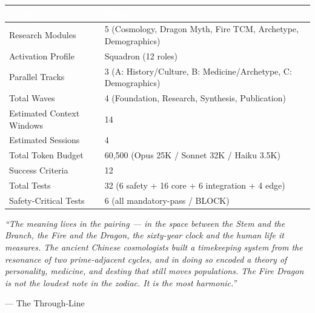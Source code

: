 \documentclass[11pt,letterpaper]{article}
\newcommand{\tableheader}[1]{\textbf{\sffamily\textcolor{white}{#1}}}
\begin{document}
\begin{center}
\begin{tabularx}{\textwidth}{L{4cm}X}
\toprule
{}
\tableheader{Metric} & \tableheader{Value} \\
\midrule
Research Modules & 5 (Cosmology, Dragon Myth, Fire TCM, Archetype, Demographics) \\
Activation Profile & Squadron (12 roles) \\
Parallel Tracks & 3 (A: History/Culture, B: Medicine/Archetype, C: Demographics) \\
Total Waves & 4 (Foundation, Research, Synthesis, Publication) \\
Estimated Context Windows & 14 \\
Estimated Sessions & 4 \\
Total Token Budget & 60,500 (Opus 25K / Sonnet 32K / Haiku 3.5K) \\
Success Criteria & 12 \\
Total Tests & 32 (6 safety + 16 core + 6 integration + 4 edge) \\
Safety-Critical Tests & 6 (all mandatory-pass / BLOCK) \\
\bottomrule
\end{tabularx}
\end{center}

\vspace{1em}

\begin{quotebox}
\emph{``The meaning lives in the pairing --- in the space between the Stem and the Branch, the Fire and the Dragon, the sixty-year clock and the human life it measures. The ancient Chinese cosmologists built a timekeeping system from the resonance of two prime-adjacent cycles, and in doing so encoded a theory of personality, medicine, and destiny that still moves populations. The Fire Dragon is not the loudest note in the zodiac. It is the most harmonic.''}

\vspace{0.5em}
\hfill --- The Through-Line
\end{quotebox}
\end{document}

